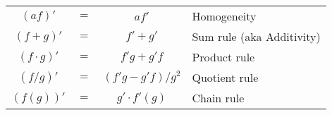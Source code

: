 \medskip
\begin{tabular}{c c c l}
  $(a f)'$        &$=$& $ a f'$              & Homogeneity \\
  $(f + g)'$      &$=$& $f' + g'$            & Sum rule (aka Additivity) \\
  $(f \cdot g)'$  &$=$& $f' g + g' f$        & Product rule \\
  $(f / g)'$      &$=$& $(f' g - g' f)/g^2$  & Quotient rule \\
  $(f( g))'$      &$=$& $g' \cdot f'(g)$     & Chain rule \\
\end{tabular}
\medskip



